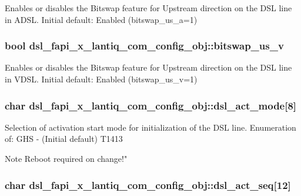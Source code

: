 Enables or disables the Bitswap feature for Upstream direction on the D\-S\-L line in A\-D\-S\-L. Initial default\-: Enabled (bitswap\-\_\-us\-\_\-a=1) \hypertarget{structdsl__fapi__x__lantiq__com__config__obj_a95dbacbdd804a3d90d472cb66d6980d0}{
\subsubsection[{bitswap\-\_\-us\-\_\-v}]{\setlength{\rightskip}{0pt plus 5cm}bool dsl\-\_\-fapi\-\_\-x\-\_\-lantiq\-\_\-com\-\_\-config\-\_\-obj\-::bitswap\-\_\-us\-\_\-v}}\label{structdsl__fapi__x__lantiq__com__config__obj_a95dbacbdd804a3d90d472cb66d6980d0}
Enables or disables the Bitswap feature for Upstream direction on the D\-S\-L line in V\-D\-S\-L. Initial default\-: Enabled (bitswap\-\_\-us\-\_\-v=1) \hypertarget{structdsl__fapi__x__lantiq__com__config__obj_ac4bb180638691e00261dcdf6d2665270}{
\subsubsection[{dsl\-\_\-act\-\_\-mode}]{\setlength{\rightskip}{0pt plus 5cm}char dsl\-\_\-fapi\-\_\-x\-\_\-lantiq\-\_\-com\-\_\-config\-\_\-obj\-::dsl\-\_\-act\-\_\-mode\mbox{[}8\mbox{]}}}\label{structdsl__fapi__x__lantiq__com__config__obj_ac4bb180638691e00261dcdf6d2665270}
Selection of activation start mode for initialization of the D\-S\-L line. Enumeration of\-: G\-H\-S -\/ (Initial default) T1413 \begin{DoxyNote}{Note}
Reboot required on change!" 
\end{DoxyNote}
\hypertarget{structdsl__fapi__x__lantiq__com__config__obj_a1379ebdfd3e4c578081e1f7a033bf64f}{
\subsubsection[{dsl\-\_\-act\-\_\-seq}]{\setlength{\rightskip}{0pt plus 5cm}char dsl\-\_\-fapi\-\_\-x\-\_\-lantiq\-\_\-com\-\_\-config\-\_\-obj\-::dsl\-\_\-act\-\_\-seq\mbox{[}12\mbox{]}}}\label{structdsl__fapi__x__lantiq__com__config__obj_a1379ebdfd3e4c578081e1f7a033bf64f}
